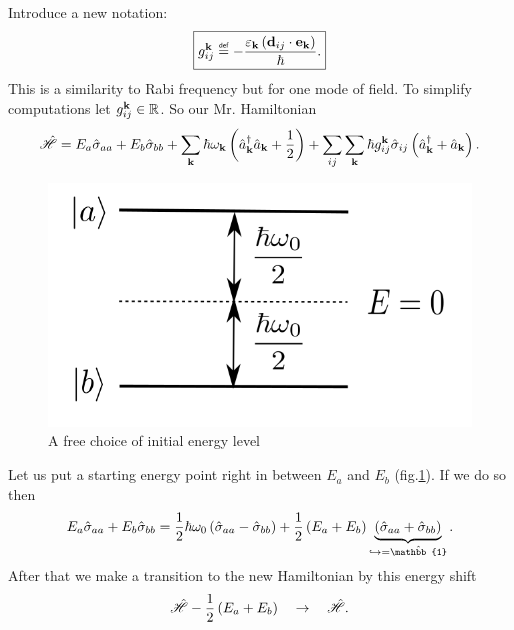 Introduce a new notation:
\begin{equation}
	\boxed{	g_{ij}^{\kv} \myeq - \frac{ \varepsilon_{\kv} \left(\vec{d}_{ij} \cdot  \vec{e}_{\kv}\right)}{\hbar}.}
\end{equation}
This is a similarity to Rabi frequency but for one mode of field. To simplify computations let $g^{\mathbf{k}}_{ij} \in \mathbb{R}$. So our Mr. Hamiltonian 
\begin{equation}
	\hat{\mathscr{H}} = E_a \hat{\sigma}_{aa} + E_b \hat{\sigma}_{bb} + \sum_{\mathbf{k}} \hbar \omega_{\mathbf{k}} \left( \hat{a}^{\dagger}_{\mathbf{k}} \hat{a}_{\mathbf{k}} + \frac{1}{2} \right) + \sum_{ij} \sum_{\mathbf{k}} \hbar g_{ij}^{\mathbf{k}} \hat{\sigma}_{ij} \left( \hat{a}^{\dagger}_{\mathbf{k}} +  \hat{a}_{\mathbf{k}} \right).
\end{equation}
\begin{figure}
	\centering
	\includegraphics[width=0.4\linewidth]{fig/L6/E00000}
	\caption{A free choice of initial energy level}
	\label{fig:e00000}
\end{figure}
Let us put a starting energy point right in between $E_a$ and $E_b$ (fig.\ref{fig:e00000}). If we do so then
\begin{equation}
	E_a \hat{\sigma}_{aa} + E_b \hat{\sigma}_{bb} = \half \hbar \omega_0 \left( \hat{\sigma}_{aa} - \hat{\sigma}_{bb} \right) + \half \left( E_a + E_b \right)\underbrace{\left( \hat{\sigma}_{aa} + \hat{\sigma}_{bb} \right)}_{\hookrightarrow = \hat{\mathbb{1}}}.
\end{equation}
After that we make a transition to the new Hamiltonian by this energy shift
\begin{equation}
	\hat{\mathscr{H}} - \frac{1}{2} \left( E_a + E_b \right) \quad \to \quad \hat{\mathscr{H}}.
\end{equation}

